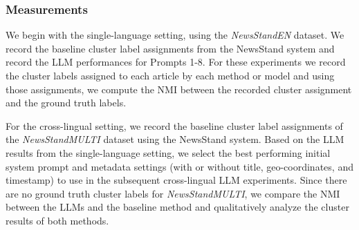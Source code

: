 \subsubsection{Measurements}
We begin with the single-language setting, using the \emph{NewsStandEN} dataset.
We record the baseline cluster label assignments from the NewsStand system and record the LLM performances for Prompts 1-8.
For these experiments we record the cluster labels assigned to each article by each method or model and using those assignments, we compute the \ac{NMI} between the recorded cluster assignment and the ground truth labels.

For the cross-lingual setting, we record the baseline cluster label assignments of the \emph{NewsStandMULTI} dataset using the NewsStand system.
Based on the LLM results from the single-language setting, we select the best performing initial system prompt and metadata settings (with or without title, geo-coordinates, and timestamp) to use in the subsequent cross-lingual LLM experiments.
Since there are no ground truth cluster labels for \emph{NewsStandMULTI}, we compare the \ac{NMI} between the LLMs and the baseline method and qualitatively analyze the cluster results of both methods.





